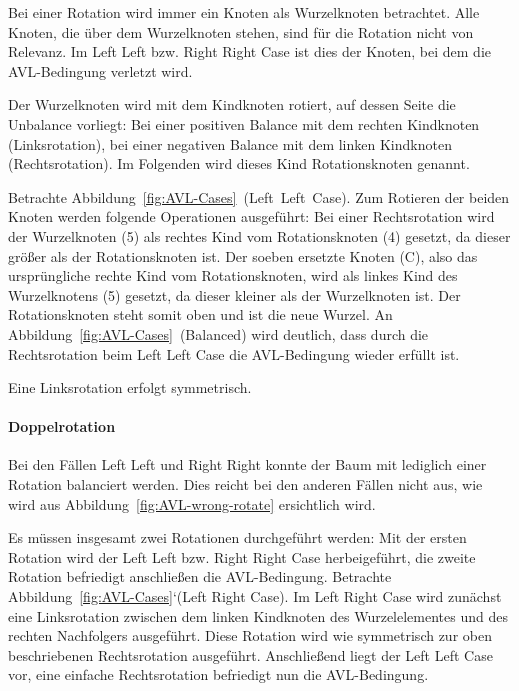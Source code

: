 Bei einer Rotation wird immer ein Knoten als Wurzelknoten betrachtet.
Alle Knoten, die über dem Wurzelknoten stehen, sind für die Rotation nicht von
Relevanz.
Im Left Left bzw. Right Right Case ist dies der Knoten,
bei dem die AVL-Bedingung verletzt wird.

Der Wurzelknoten wird mit dem Kindknoten rotiert, auf dessen Seite die
Unbalance vorliegt:
Bei einer positiven Balance mit dem rechten Kindknoten (Linksrotation),
bei einer negativen Balance mit dem linken Kindknoten (Rechtsrotation).
Im Folgenden wird dieses Kind Rotationsknoten genannt.

Betrachte Abbildung~\ref{fig:AVL-Cases}~(Left~Left~Case).
Zum Rotieren der beiden Knoten werden folgende Operationen ausgeführt:
Bei einer Rechtsrotation wird der Wurzelknoten (5) als rechtes Kind vom
Rotationsknoten (4) gesetzt, da dieser größer als der Rotationsknoten ist.
Der soeben ersetzte Knoten (C), also das ursprüngliche rechte Kind vom
Rotationsknoten, wird als linkes Kind des Wurzelknotens (5) gesetzt,
da dieser kleiner als der Wurzelknoten ist.
Der Rotationsknoten steht somit oben und ist die neue Wurzel.
An Abbildung~\ref{fig:AVL-Cases}~(Balanced) wird deutlich, dass durch die
Rechtsrotation beim Left Left Case die AVL-Bedingung wieder erfüllt ist.

Eine Linksrotation erfolgt symmetrisch.

\paragraph{Doppelrotation}

Bei den Fällen Left Left und Right Right konnte der Baum mit lediglich
einer Rotation balanciert werden.
Dies reicht bei den anderen Fällen nicht aus, wie wird aus Abbildung~\ref{fig:AVL-wrong-rotate}
ersichtlich wird.

Es müssen insgesamt zwei Rotationen durchgeführt werden:
Mit der ersten Rotation wird der Left Left bzw. Right Right Case
herbeigeführt, die zweite Rotation befriedigt anschließen die AVL-Bedingung.
Betrachte Abbildung~\ref{fig:AVL-Cases}`(Left Right Case).
Im Left Right Case wird zunächst eine Linksrotation zwischen dem linken
Kindknoten des Wurzelelementes und des rechten Nachfolgers ausgeführt.
Diese Rotation wird wie symmetrisch zur oben beschriebenen Rechtsrotation ausgeführt.
Anschließend liegt der Left Left Case vor, eine einfache Rechtsrotation
befriedigt nun die AVL-Bedingung.


